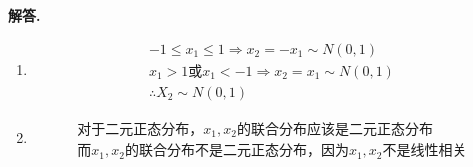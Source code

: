 \documentclass[12pt, a4paper, oneside]{ctexart}
\newenvironment{solution}{\par\noindent\textbf{解答. }}{\par}
\begin{document}
\begin{solution}
    \begin{enumerate}[label=(\alph*)]
        \item
        \[
        \begin{gathered}
            -1\leq x_1 \leq 1 \Rightarrow x_2=-x_1 \sim N(0,1)\\
            x_1>1 \text{或} x_1<-1 \Rightarrow x_2=x_1 \sim N(0,1)\\
            \therefore X_2 \sim N(0,1)
        \end{gathered}
        \]
        \item 
        \[
            \begin{gathered}
                \text{对于二元正态分布，}x_1,x_2 \text{的联合分布应该是二元正态分布}\\
                \text{而}x_1,x_2 \text{的联合分布不是二元正态分布，因为}x_1,x_2 \text{不是线性相关}
            \end{gathered}
        \]
    \end{enumerate}
\end{solution}
\end{document}

